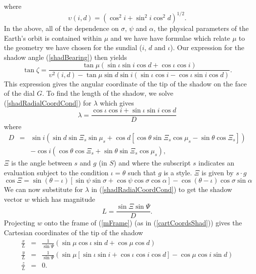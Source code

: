 \documentclass[12pt]{article}
\newcommand{\nn}{\nonumber}
\newcommand{\dt}{\! \cdot \!}
\begin{document}
%
where
%
\begin{equation}
\upsilon(i,d) = (\cos^2 i + \sin^2 i\cos^2 d)^{1/2}.
\end{equation}
%
In the above, all of the dependence on $\sigma$, $\psi$ and $\alpha$, the physical parameters of the Earth's orbit is contained within $\mu$ and we have have formulae which relate $\mu$ to the geometry we have chosen for the sundial ($i$, $d$ and $\iota$). Our expression for the shadow angle (\ref{shadBearing}) then yields
%
\begin{equation} \label{tanzeta}
\tan\zeta = \frac{\tan\mu(\sin\iota\sin i \cos d + \cos\iota\cos i)}
{\upsilon^2(i,d) - \tan\mu\sin d\sin i(\sin\iota\cos i - \cos\iota\sin i\cos d)}.
\end{equation}
%
This expression gives the angular coordinate of the tip of the shadow on the face of the dial $G$. To find the length of the shadow, we solve (\ref{shadRadialCoordCond}) for $\lambda$ which gives
%
\begin{equation}
\lambda = \frac{\cos\iota\cos i + \sin\iota\sin i \cos d}{D}
\end{equation}
%
where
%
\begin{eqnarray} \label{D}
D 	& = & \sin i \left( \sin d\sin\Xi_s\sin\mu_s + \cos d\left[\cos\theta\sin\Xi_s\cos\mu_s - \sin\theta\cos\Xi_s\right] \right ) \\ \nn
	&   & - \cos i \left( \cos\theta\cos\Xi_s + \sin\theta\sin\Xi_s\cos\mu_s \right),
\end{eqnarray}
%
$\Xi$ is the angle between $s$ and $g$ (in $S$) and where the subscript $s$ indicates an evaluation subject to the condition $\iota = \theta$ such that $g$ is a style. $\Xi$ is given by $s\dt g$
%
\begin{equation}
\cos\Xi = \sin(\theta-\iota)[\sin\psi\sin\sigma + \cos\psi\cos\sigma\cos\alpha] - \cos(\theta-\iota)\cos\sigma\sin\alpha
\end{equation}
%
We can now substitute for $\lambda$ in (\ref{shadRadialCoordCond}) to get the shadow vector $w$ which has magnitude
%
\begin{equation} \label{L}
L = \frac{\sin\Xi\sin\Psi}{D}.
\end{equation}
%
Projecting $w$ onto the frame of (\ref{mFrame}) (as in (\ref{cartCoordsShad})) gives the Cartesian coordinates of the tip of the shadow
%
\begin{eqnarray} \label{shadTipCartCoords}
\frac{x}{L} & = & \frac{1}{\sin\Psi} (\sin\mu\cos\iota\sin d + \cos\mu\cos d)\\ \nn
\frac{y}{L} & = & \frac{1}{\sin\Psi} (\sin\mu[\sin\iota\sin i + \cos\iota\cos i\cos d] - \cos\mu\cos i\sin d)\\ \nn
\frac{z}{L} & = & 0.
\end{eqnarray}
\end{document}
